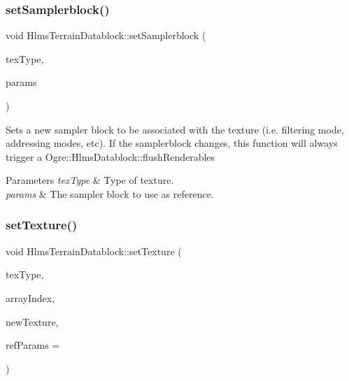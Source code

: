 \subsubsection{\texorpdfstring{set\+Samplerblock()}{setSamplerblock()}}
{\footnotesize\ttfamily void Hlms\+Terrain\+Datablock\+::set\+Samplerblock (\begin{DoxyParamCaption}\item[{Terrain\+Texture\+Types}]{tex\+Type,  }\item[{const Ogre\+::\+Hlms\+Samplerblock \&}]{params }\end{DoxyParamCaption})}

Sets a new sampler block to be associated with the texture (i.\+e. filtering mode, addressing modes, etc). If the samplerblock changes, this function will always trigger a Ogre\+::\+Hlms\+Datablock\+::flush\+Renderables 
\begin{DoxyParams}{Parameters}
{\em tex\+Type} & Type of texture. \\
\hline
{\em params} & The sampler block to use as reference. \\
\hline
\end{DoxyParams}
\mbox{\label{class_hlms_terrain_datablock_a1b27f8fe762d440e239b082b063dccc3}} 
\subsubsection{\texorpdfstring{set\+Texture()}{setTexture()}}
{\footnotesize\ttfamily void Hlms\+Terrain\+Datablock\+::set\+Texture (\begin{DoxyParamCaption}\item[{Terrain\+Texture\+Types}]{tex\+Type,  }\item[{Ogre\+::uint16}]{array\+Index,  }\item[{const Ogre\+::\+Texture\+Ptr \&}]{new\+Texture,  }\item[{const Ogre\+::\+Hlms\+Samplerblock $\ast$}]{ref\+Params = {} }\end{DoxyParamCaption})}

